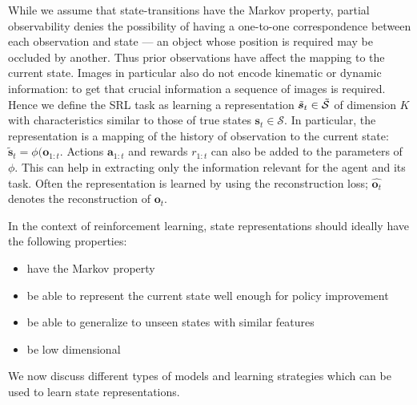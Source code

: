 While we assume that state-transitions have the Markov property,
partial observability denies the possibility of having a one-to-one
correspondence between each observation and state ---
an object whose position is required may be occluded by another.
Thus prior observations have affect the mapping to the current state.
Images in particular also do not encode kinematic or dynamic information:
to get that crucial information a sequence of images is required.
Hence we define the SRL task as learning
a representation $ \tilde{\bm{s}}_{t} \in \tilde{\cal{S}}  $ of dimension $ K  $
with characteristics similar to those of true states $ \bm{s}_{t} \in \mathcal{S} $.
In particular, the representation is a mapping of the history of 
observation to the current state: $ \tilde{\bm{s}}_{t} = \phi(\bm{o}_{1:t}  $.
Actions $ \bm{a}_{1:t}  $ and rewards $ r_{ 1:t }  $ can also be added
to the parameters of $ \phi  $.
This can help in extracting only the information relevant for the agent and its task.
Often the representation is learned by using the reconstruction loss;
$ \hat{\bm{o}_{t}}  $ denotes the reconstruction of $ \bm{o}_{t}  $.

In the context of reinforcement learning, state representations should
ideally have the following properties:
\begin{itemize}
		\item have the Markov property 
		\item be able to represent the current state well enough for policy improvement
		\item be able to generalize to unseen states with similar features
		\item be low dimensional
\end{itemize}
We now discuss different types of models and learning strategies which 
can be used to learn state representations.

